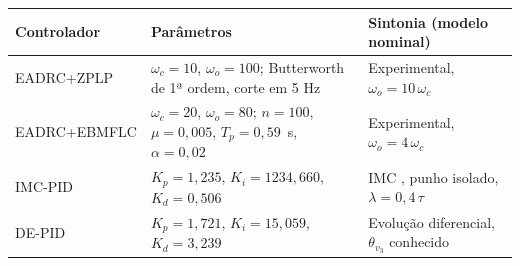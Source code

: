 \footnotesize
\begin{tabularx}{\textwidth}{l >{\raggedright\arraybackslash}X l}
    \toprule
    Controlador & Parâmetros & Sintonia (modelo nominal) \\
    \midrule
    EADRC+ZPLP &
        $\omega_c = 10$, $\omega_o = 100$; Butterworth de 1ª ordem, corte em 5 Hz &
        Experimental, $\omega_o = 10\,\omega_c$ \\
    EADRC+EBMFLC &
        $\omega_c = 20$, $\omega_o = 80$; $n = 100$, $\mu = 0{,}005$, $T_p = 0{,}59$~s, $\alpha = 0{,}02$ &
        Experimental, $\omega_o = 4\,\omega_c$ \\
    IMC-PID &
        $K_p = 1{,}235$, $K_i = 1234{,}660$, $K_d = 0{,}506$ &
        IMC \cite{Rivera:1986}, punho isolado, $\lambda = 0{,}4\,\tau$ \\
    DE-PID &
        $K_p = 1{,}721$, $K_i = 15{,}059$, $K_d = 3{,}239$ &
        Evolução diferencial, $\theta_{v_3}$ conhecido \\
    \bottomrule
\end{tabularx}

